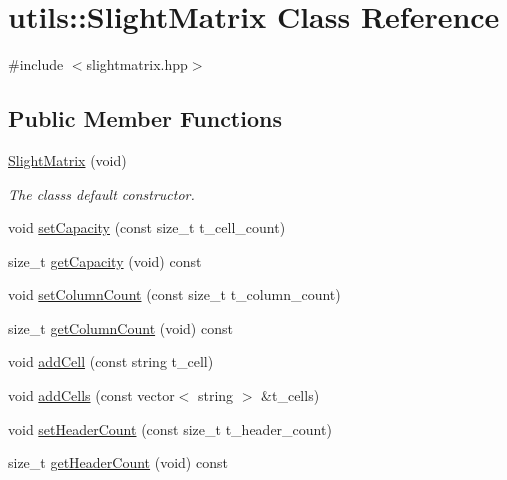 \hypertarget{classutils_1_1SlightMatrix}{}\section{utils\+:\+:Slight\+Matrix Class Reference}
\label{classutils_1_1SlightMatrix}


{\ttfamily \#include $<$slightmatrix.\+hpp$>$}

\subsection*{Public Member Functions}
\begin{DoxyCompactItemize}
\item 
\mbox{\label{classutils_1_1SlightMatrix_a2c2eb567ef914ecde524b3af725258fd}} 
\hyperlink{classutils_1_1SlightMatrix_a2c2eb567ef914ecde524b3af725258fd}{Slight\+Matrix} (void)
\begin{DoxyCompactList}\small\item\em The class\textquotesingle{}s default constructor. \end{DoxyCompactList}\item 
void \hyperlink{classutils_1_1SlightMatrix_ac0c6859041a90cfdf39d6c4f5a668814}{set\+Capacity} (const size\+\_\+t t\+\_\+cell\+\_\+count)
\item 
size\+\_\+t \hyperlink{classutils_1_1SlightMatrix_addbfd1ec641100a7cda0b4f6e39ae676}{get\+Capacity} (void) const
\item 
void \hyperlink{classutils_1_1SlightMatrix_a5f633b5225716e60a69cdca3b43f380c}{set\+Column\+Count} (const size\+\_\+t t\+\_\+column\+\_\+count)
\item 
size\+\_\+t \hyperlink{classutils_1_1SlightMatrix_aa08a3c2d096ac82b1688b1edc5bb71fd}{get\+Column\+Count} (void) const
\item 
void \hyperlink{classutils_1_1SlightMatrix_ac2d5111e5a9865886f5370bf1487d04c}{add\+Cell} (const string t\+\_\+cell)
\item 
void \hyperlink{classutils_1_1SlightMatrix_ad8874298dd54748b660fe9546ff9b332}{add\+Cells} (const vector$<$ string $>$ \&t\+\_\+cells)
\item 
void \hyperlink{classutils_1_1SlightMatrix_abe914aa8f3178afae99ec31502ba2d35}{set\+Header\+Count} (const size\+\_\+t t\+\_\+header\+\_\+count)
\item 
size\+\_\+t \hyperlink{classutils_1_1SlightMatrix_ac3ba42c47509027bd1c4a07055f347b9}{get\+Header\+Count} (void) const

\end{DoxyCompactItemize}
